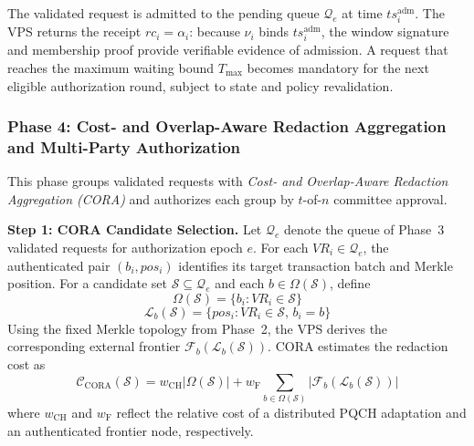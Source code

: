 \documentclass[lettersize,journal]{IEEEtran}
\begin{document}
The validated request is admitted to the pending queue
$\mathcal{Q}_e$ at time $ts_i^{\mathrm{adm}}$. The VPS returns
the receipt $rc_i=\alpha_i$: because $\nu_i$ binds
$ts_i^{\mathrm{adm}}$, the window signature and membership proof
provide verifiable evidence of admission. A request that reaches
the maximum waiting bound $T_{\max}$ becomes mandatory for the next
eligible authorization round, subject to state and policy revalidation.    
    
  \subsubsection*{\textbf{Phase 4: Cost- and Overlap-Aware Redaction
Aggregation and Multi-Party Authorization}}

This phase groups validated requests with \emph{Cost- and Overlap-Aware
Redaction Aggregation (CORA)} and authorizes each group by $t$-of-$n$
committee approval.

\medskip
\noindent\textbf{Step 1: CORA Candidate Selection.}
Let $\mathcal{Q}_e$ denote the queue of Phase~3 validated requests for
authorization epoch $e$. For each $VR_i\in\mathcal{Q}_e$, the authenticated
pair $(b_i,pos_i)$ identifies its target transaction batch and Merkle
position. For a candidate set $\mathcal{S}\subseteq\mathcal{Q}_e$ and
each $b\in\Omega(\mathcal{S})$, define
\begin{equation}
\Omega(\mathcal{S})=\{b_i:VR_i\in\mathcal{S}\}
\end{equation}
\begin{equation}
\mathcal{L}_b(\mathcal{S})=\{pos_i:VR_i\in\mathcal{S},\,b_i=b\}
\end{equation}
Using the fixed Merkle topology from Phase~2, the VPS derives the
corresponding external frontier
$\mathcal{F}_b(\mathcal{L}_b(\mathcal{S}))$. CORA estimates the
redaction cost as
\begin{equation}
\mathcal{C}_{\mathrm{CORA}}(\mathcal{S})
=
w_{\mathrm{CH}}|\Omega(\mathcal{S})|
+
w_{\mathrm{F}}
\sum_{b\in\Omega(\mathcal{S})}
|\mathcal{F}_b(\mathcal{L}_b(\mathcal{S}))|
\end{equation}
where $w_{\mathrm{CH}}$ and $w_{\mathrm{F}}$ reflect the relative cost
of a distributed PQCH adaptation and an authenticated frontier node,
respectively.
\end{document}
